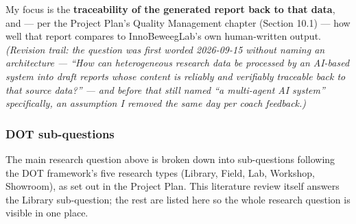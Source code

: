 My focus is the \textbf{traceability of the generated report back to that data}, and — per the Project Plan's Quality Management chapter (Section 10.1) — how well that report compares to InnoBeweegLab's own human-written output. \textit{(Revision trail: the question was first worded 2026-09-15 without naming an architecture — \textquotedblleft{}How can heterogeneous research data be processed by an AI-based system into draft reports whose content is reliably and verifiably traceable back to that source data?\textquotedblright{} — and before that still named \textquotedblleft{}a multi-agent AI system\textquotedblright{} specifically, an assumption I removed the same day per coach feedback.)}



\subsubsection*{DOT sub-questions}


The main research question above is broken down into sub-questions following the DOT framework's five research types (Library, Field, Lab, Workshop, Showroom), as set out in the Project Plan. This literature review itself answers the Library sub-question; the rest are listed here so the whole research question is visible in one place.



